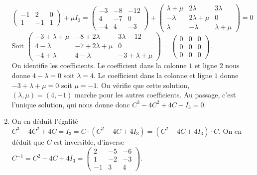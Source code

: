 \documentclass[a4paper, 10pt]{article}
\theoremstyle{plain}
\begin{document}
\begin{enumerate}
\[\begin{pmatrix}
-1 & 2 & 0 \\
1 & -1 & 1
\end{pmatrix}
 +\mu I_3
= 
\begin{pmatrix}
-3 & -8 & -12 \\
4 & -7 & 0 \\
-4 &4 & -3
\end{pmatrix}
+
\begin{pmatrix}
\lambda + \mu & 2\lambda & 3\lambda \\
-\lambda & 2 \lambda + \mu & 0 \\
\lambda & - \lambda & \lambda + \mu 
\end{pmatrix}
=0
 \]
 Soit 
 $\begin{pmatrix}
 -3 + \lambda + \mu & -8 +2\lambda & 3 \lambda -12 \\
 4- \lambda & -7 +2\lambda +\mu & 0 \\
 -4 + \lambda & 4 - \lambda & -3 +\lambda + \mu 
 \end{pmatrix}
 = \begin{pmatrix}
 0&0&0\\
 0&0&0\\
 0&0&0
 \end{pmatrix}
 $. \\
On identifie les coefficients.
Le coefficient dans la colonne $1$ et ligne $2$ nous donne 
$4-\lambda =0$ soit $\lambda = 4$.
Le coefficient dans la colonne et ligne $1$ donne 
$-3+\lambda +\mu =0$ soit $\mu = -1$. On vérifie que cette solution, 
$(\lambda , \mu ) =(4,-1)$ marche pour les autres coefficients. 
Au passage, c'est l'unique solution, 
qui nous donne donc 
$C^3 -4C^2 +4C -I_3=0$.
\item 
On en déduit l'égalité 
$C^3-4C^2 +4C = I_3 = C\cdot (C^2-4C+4I_3)= (C^2-4C +4I_3)\cdot C$.
On en déduit que $C$ est inversible, d'inverse 
$C^{-1} = C^2-4C+4I_3 = 
\begin{pmatrix}
2 & -5 & -6 \\
1 & -2 & -3 \\
-1 & 3 & 4
\end{pmatrix}
$.
\end{enumerate}
\end{document}
